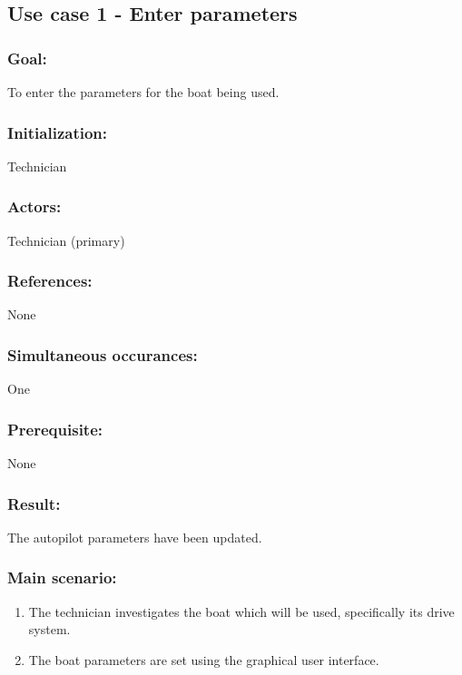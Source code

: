\begin{framed}
	\subsection{Use case 1 - Enter parameters}
	\subsubsection*{Goal:}
		To enter the parameters for the boat being used.
		
	\subsubsection*{Initialization:}
		Technician
	
	\subsubsection*{Actors:}
		Technician (primary)
	
	\subsubsection*{References:}
		None
	
	\subsubsection*{Simultaneous occurances:}
		One
	
	\subsubsection*{Prerequisite:}
		None
	
	\subsubsection*{Result:}
		The autopilot parameters have been updated.
	
	\subsubsection*{Main scenario:}
		\begin{enumerate}
			\item The technician investigates the boat which will be used, specifically its drive system.
			\item The boat parameters are set using the graphical user interface. 
		\end{enumerate}	
\end{framed}

